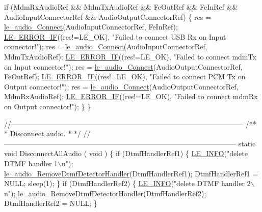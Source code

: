 \begin{DoxyCodeInclude}
{{{{    \textcolor{keywordflow}{if} (MdmRxAudioRef && MdmTxAudioRef && FeOutRef && FeInRef &&
        AudioInputConnectorRef && AudioOutputConnectorRef)
    \{
        res = \hyperlink{le__audio__interface_8h_a338df65b2fb1ae0140d86880adbcf0de}{le\_audio\_Connect}(AudioInputConnectorRef, FeInRef);
        \hyperlink{le__log_8h_aceaf11a11691d6c676e36dd317b38dbd}{LE\_ERROR\_IF}((res!=LE\_OK), \textcolor{stringliteral}{"Failed to connect USB Rx on Input connector!"});
        res = \hyperlink{le__audio__interface_8h_a338df65b2fb1ae0140d86880adbcf0de}{le\_audio\_Connect}(AudioInputConnectorRef, MdmTxAudioRef);
        \hyperlink{le__log_8h_aceaf11a11691d6c676e36dd317b38dbd}{LE\_ERROR\_IF}((res!=LE\_OK), \textcolor{stringliteral}{"Failed to connect mdmTx on Input connector!"});
        res = \hyperlink{le__audio__interface_8h_a338df65b2fb1ae0140d86880adbcf0de}{le\_audio\_Connect}(AudioOutputConnectorRef, FeOutRef);
        \hyperlink{le__log_8h_aceaf11a11691d6c676e36dd317b38dbd}{LE\_ERROR\_IF}((res!=LE\_OK), \textcolor{stringliteral}{"Failed to connect PCM Tx on Output connector!"});
        res = \hyperlink{le__audio__interface_8h_a338df65b2fb1ae0140d86880adbcf0de}{le\_audio\_Connect}(AudioOutputConnectorRef, MdmRxAudioRef);
        \hyperlink{le__log_8h_aceaf11a11691d6c676e36dd317b38dbd}{LE\_ERROR\_IF}((res!=LE\_OK), \textcolor{stringliteral}{"Failed to connect mdmRx on Output connector!"});
    \}
\}

\textcolor{comment}{//--------------------------------------------------------------------------------------------------}\textcolor{comment}{}
\textcolor{comment}{/**}
\textcolor{comment}{ * Disconnect audio.}
\textcolor{comment}{ *}
\textcolor{comment}{ */}
\textcolor{comment}{//--------------------------------------------------------------------------------------------------}
\textcolor{keyword}{static} \textcolor{keywordtype}{void} DisconnectAllAudio
(
    \textcolor{keywordtype}{void}
)
\{
    \textcolor{keywordflow}{if} (DtmfHandlerRef1)
    \{
        \hyperlink{le__log_8h_a23e6d206faa64f612045d688cdde5808}{LE\_INFO}(\textcolor{stringliteral}{"delete DTMF handler 1\(\backslash\)n"});
        \hyperlink{le__audio__interface_8h_aeb1d43fbf2a741fbd91172a90666247d}{le\_audio\_RemoveDtmfDetectorHandler}(DtmfHandlerRef1);
        DtmfHandlerRef1 = NULL;
        sleep(1);
    \}
    \textcolor{keywordflow}{if} (DtmfHandlerRef2)
    \{
        \hyperlink{le__log_8h_a23e6d206faa64f612045d688cdde5808}{LE\_INFO}(\textcolor{stringliteral}{"delete DTMF handler 2\(\backslash\)n"});
        \hyperlink{le__audio__interface_8h_aeb1d43fbf2a741fbd91172a90666247d}{le\_audio\_RemoveDtmfDetectorHandler}(DtmfHandlerRef2);
        DtmfHandlerRef2 = NULL;
    \}

}}}}
\end{DoxyCodeInclude}
